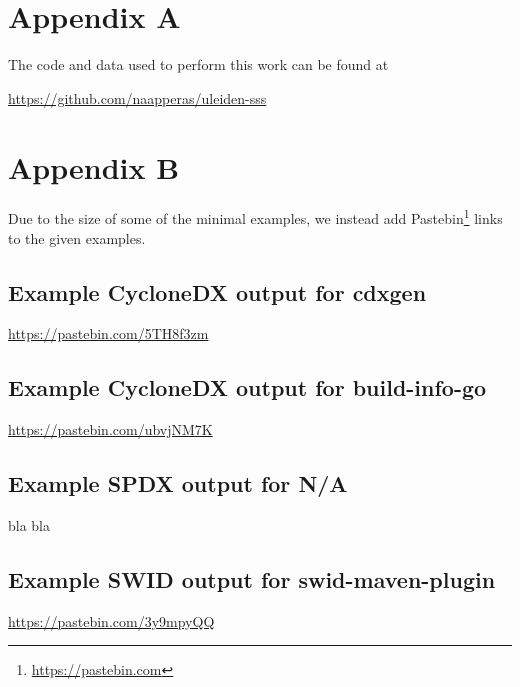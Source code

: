 \appendix

\section{Appendix A}

The code and data used to perform this work can be found at
\begin{center}
    \href{https://github.com/Naapperas/uleiden-sss/tree/main/assignments/2}{https://github.com/naapperas/uleiden-sss}
\end{center}

\section{Appendix B}


Due to the size of some of the minimal examples, we instead add Pastebin\footnote{\href{https://pastebin.com}{https://pastebin.com}} links to the given examples.

\subsection{Example CycloneDX output for \textbf{cdxgen}}

\href{https://pastebin.com/5TH8f3zm}{https://pastebin.com/5TH8f3zm}

\subsection{Example CycloneDX output for \textbf{build-info-go}}

\href{https://pastebin.com/ubvjNM7K}{https://pastebin.com/ubvjNM7K}

\subsection{Example SPDX output for \textbf{N/A}}

bla bla


\subsection{Example SWID output for \textbf{swid-maven-plugin}} \label{appendix:swid-maven-plugin}
\href{https://pastebin.com/3y9mpyQQ}{https://pastebin.com/3y9mpyQQ}


